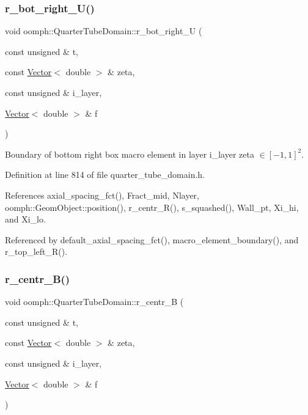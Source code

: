 \subsubsection{\texorpdfstring{r\+\_\+bot\+\_\+right\+\_\+\+U()}{r\_bot\_right\_U()}}
{\footnotesize\ttfamily void oomph\+::\+Quarter\+Tube\+Domain\+::r\+\_\+bot\+\_\+right\+\_\+U (\begin{DoxyParamCaption}\item[{const unsigned \&}]{t,  }\item[{const \hyperlink{classoomph_1_1Vector}{Vector}$<$ double $>$ \&}]{zeta,  }\item[{const unsigned \&}]{i\+\_\+layer,  }\item[{\hyperlink{classoomph_1_1Vector}{Vector}$<$ double $>$ \&}]{f }\end{DoxyParamCaption})\hspace{0.3cm}{\ttfamily [private]}}



Boundary of bottom right box macro element in layer i\+\_\+layer zeta $ \in [-1,1]^2 $. 



Definition at line 814 of file quarter\+\_\+tube\+\_\+domain.\+h.



References axial\+\_\+spacing\+\_\+fct(), Fract\+\_\+mid, Nlayer, oomph\+::\+Geom\+Object\+::position(), r\+\_\+centr\+\_\+\+R(), s\+\_\+squashed(), Wall\+\_\+pt, Xi\+\_\+hi, and Xi\+\_\+lo.



Referenced by default\+\_\+axial\+\_\+spacing\+\_\+fct(), macro\+\_\+element\+\_\+boundary(), and r\+\_\+top\+\_\+left\+\_\+\+R().

\mbox{\label{classoomph_1_1QuarterTubeDomain_a32896043befe8df1ff01d9de166c1201}} 
\subsubsection{\texorpdfstring{r\+\_\+centr\+\_\+\+B()}{r\_centr\_B()}}
{\footnotesize\ttfamily void oomph\+::\+Quarter\+Tube\+Domain\+::r\+\_\+centr\+\_\+B (\begin{DoxyParamCaption}\item[{const unsigned \&}]{t,  }\item[{const \hyperlink{classoomph_1_1Vector}{Vector}$<$ double $>$ \&}]{zeta,  }\item[{const unsigned \&}]{i\+\_\+layer,  }\item[{\hyperlink{classoomph_1_1Vector}{Vector}$<$ double $>$ \&}]{f }\end{DoxyParamCaption})\hspace{0.3cm}{\ttfamily [private]}}



